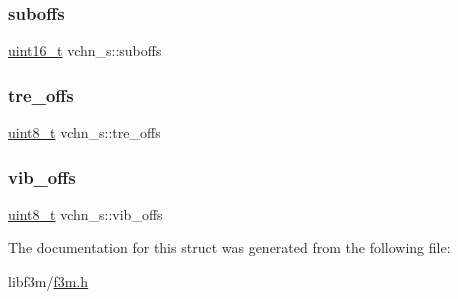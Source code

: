 \mbox{\label{structvchn__s_a1b02ef0b17eb67e13720ba05c670da05}} 
\subsubsection{\texorpdfstring{suboffs}{suboffs}}
{\footnotesize\ttfamily \hyperlink{inttypes_8h_a273cf69d639a59973b6019625df33e30}{uint16\+\_\+t} vchn\+\_\+s\+::suboffs}

\mbox{\label{structvchn__s_ac117eb7e4e8045d2ff041f3b7633cf7d}} 
\subsubsection{\texorpdfstring{tre\+\_\+offs}{tre\_offs}}
{\footnotesize\ttfamily \hyperlink{inttypes_8h_aba7bc1797add20fe3efdf37ced1182c5}{uint8\+\_\+t} vchn\+\_\+s\+::tre\+\_\+offs}

\mbox{\label{structvchn__s_a1f1f455fd6b50be9d1ac5d8c205b7e50}} 
\subsubsection{\texorpdfstring{vib\+\_\+offs}{vib\_offs}}
{\footnotesize\ttfamily \hyperlink{inttypes_8h_aba7bc1797add20fe3efdf37ced1182c5}{uint8\+\_\+t} vchn\+\_\+s\+::vib\+\_\+offs}



The documentation for this struct was generated from the following file\+:\begin{DoxyCompactItemize}
\item 
libf3m/\hyperlink{f3m_8h}{f3m.\+h}\end{DoxyCompactItemize}
